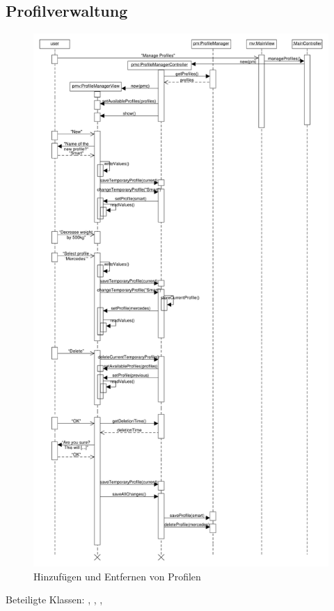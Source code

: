 \documentclass[a4paper, 11pt]{article}
\begin{document}
\subsection{Profilverwaltung}
\begin{figure}[H]
\centering
\includegraphics[height=0.9\textheight]{ProfilSequenz}
\caption{Hinzufügen und Entfernen von Profilen}
\label{fig:sequenz_profilVerwaltung}
\end{figure}
Beteiligte Klassen: , , , 
\end{document}
